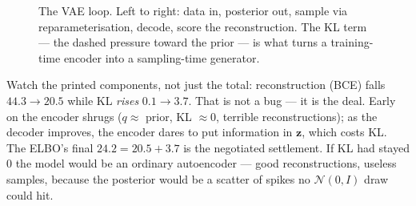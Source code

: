\begin{figure}[htbp]
\centering
{}
\caption{The VAE loop. Left to right: data in, posterior out, sample
via reparameterisation, decode, score the reconstruction. The KL
term --- the dashed pressure toward the prior --- is what turns a
training-time encoder into a sampling-time generator.}
\label{fig:vaearch}
\end{figure}





\begin{example}
\label{ex:elbo}
Watch the printed components, not just the total: reconstruction
(BCE) falls $44.3 \to 20.5$ while KL \emph{rises} $0.1 \to 3.7$. That
is not a bug --- it is the deal. Early on the encoder shrugs ($q
\approx$ prior, KL $\approx 0$, terrible reconstructions); as the
decoder improves, the encoder dares to put information in $\mathbf z$,
which costs KL. The ELBO's final $24.2 = 20.5 + 3.7$ is the negotiated
settlement. If KL had stayed $0$ the model would be an ordinary
autoencoder --- good reconstructions, useless samples, because the
posterior would be a scatter of spikes no $\mathcal N(0,I)$ draw could
hit.
\end{example}

